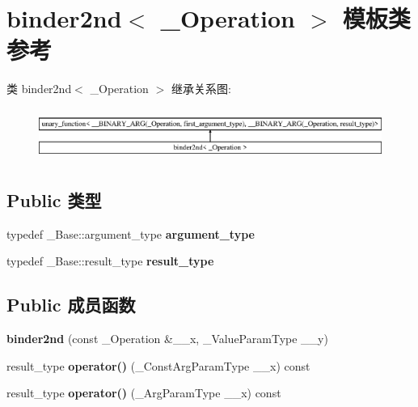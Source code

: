 \hypertarget{classbinder2nd}{}\section{binder2nd$<$ \+\_\+\+Operation $>$ 模板类 参考}
\label{classbinder2nd}
类 binder2nd$<$ \+\_\+\+Operation $>$ 继承关系图\+:\begin{figure}[H]
\begin{center}
\leavevmode
\includegraphics[height=1.717791cm]{classbinder2nd}
\end{center}
\end{figure}
\subsection*{Public 类型}
\begin{DoxyCompactItemize}
\item 
\mbox{\label{classbinder2nd_a031341d92193b961893982f071d94051}} 
typedef \+\_\+\+Base\+::argument\+\_\+type {\bfseries argument\+\_\+type}
\item 
\mbox{\label{classbinder2nd_af18bcd5d42f13d4ab2cea41c43b00e02}} 
typedef \+\_\+\+Base\+::result\+\_\+type {\bfseries result\+\_\+type}
\end{DoxyCompactItemize}
\subsection*{Public 成员函数}
\begin{DoxyCompactItemize}
\item 
\mbox{\label{classbinder2nd_a09df7eaf8853f85ab25bd84e41c41ddb}} 
{\bfseries binder2nd} (const \+\_\+\+Operation \&\+\_\+\+\_\+x, \+\_\+\+Value\+Param\+Type \+\_\+\+\_\+y)
\item 
\mbox{\label{classbinder2nd_afc5946972732f577b824eba05d59be56}} 
result\+\_\+type {\bfseries operator()} (\+\_\+\+Const\+Arg\+Param\+Type \+\_\+\+\_\+x) const
\item 
\mbox{\label{classbinder2nd_a8f8f1f859bc56d3044f7b5137416792f}} 
result\+\_\+type {\bfseries operator()} (\+\_\+\+Arg\+Param\+Type \+\_\+\+\_\+x) const
\end{DoxyCompactItemize}
